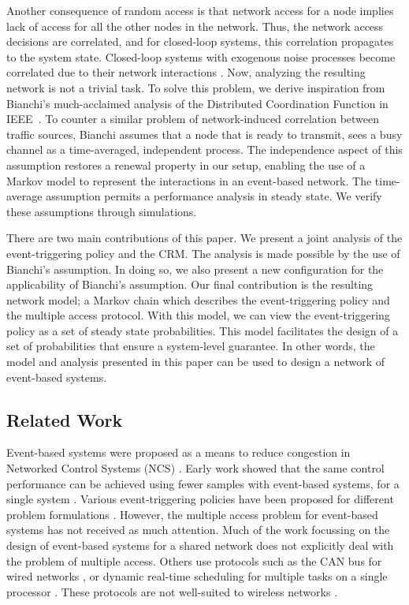 \documentclass[journal]{IEEEtran}
\begin{document}
Another consequence of random access is that network access for a node implies lack of access for all the other nodes in the network. Thus, the network access decisions are correlated, and for closed-loop systems, this correlation propagates to the system state. Closed-loop systems with exogenous noise processes become correlated due to their network interactions \cite{Cervin2008,Rabi2009}. Now, analyzing the resulting network is not a trivial task. To solve this problem, we derive inspiration from Bianchi's much-acclaimed analysis of the Distributed Coordination Function \cite{Bianchi2000} in IEEE~. To counter a similar problem of network-induced correlation between traffic sources, Bianchi assumes that a node that is ready to transmit, sees a busy channel as a time-averaged, independent process. The independence aspect of this assumption restores a renewal property in our setup, enabling the use of a Markov model to represent the interactions in an event-based network. The time-average assumption permits a performance analysis in steady state. We verify these assumptions through simulations.

There are two main contributions of this paper. We present a joint analysis of the event-triggering policy and the CRM. The analysis is made possible by the use of Bianchi's assumption. In doing so, we also present a new configuration for the applicability of Bianchi's assumption. Our final contribution is the resulting network model; a Markov chain which describes the event-triggering policy and the multiple access protocol. With this model, we can view the event-triggering policy as a set of steady state probabilities. This model facilitates the design of a set of probabilities that ensure a system-level guarantee. In other words, the model and analysis presented in this paper can be used to design a network of event-based systems.

\subsection{Related Work}
Event-based systems were proposed as a means to reduce congestion in Networked Control Systems (NCS) \cite{Astrom1999,Yook2002,Otanez2002}. Early work showed that the same control performance can be achieved using fewer samples with event-based systems, for a single system \cite{Tomovic1966,Astrom1999}. Various event-triggering policies have been proposed for different problem formulations \cite{Rabi2006,Tabuada2007,Heemels2008,Henningsson2008}. However, the multiple access problem for event-based systems has not received as much attention. Much of the work focussing on the design of event-based systems for a shared network \cite{Wang2011,Molin2012} does not explicitly deal with the problem of multiple access. Others use protocols such as the CAN bus for wired networks \cite{Anta2009a}, or dynamic real-time scheduling for multiple tasks on a single processor \cite{Tabuada2007}. These protocols are not well-suited to wireless networks \cite{Akyildiz1999,Gummalla2000}.
\end{document}
